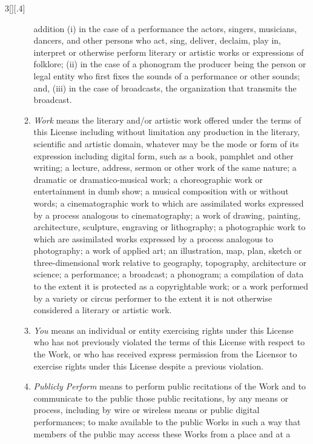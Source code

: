 \documentclass[8pt,a4paper]{article}
\begin{document}
\begin{multicols}{3}[][.4\paperwidth]
\begin{enumerate}
\begin{enumerate}
        addition (i) in the case of a performance the actors, singers,
        musicians, dancers, and other persons who act, sing, deliver, declaim,
        play in, interpret or otherwise perform literary or artistic works or
        expressions of folklore; (ii) in the case of a phonogram the producer
        being the person or legal entity who first fixes the sounds of a
        performance or other sounds; and, (iii) in the case of broadcasts, the
        organization that transmits the broadcast.
  \item \emph{Work} means the literary and/or artistic work offered under the
        terms of this License including without limitation any production in the
        literary, scientific and artistic domain, whatever may be the mode or
        form of its expression including digital form, such as a book,
        pamphlet and other writing; a lecture, address, sermon or other work
        of the same nature; a dramatic or dramatico-musical work; a
        choreographic work or entertainment in dumb show; a musical
        composition with or without words; a cinematographic work to which are
        assimilated works expressed by a process analogous to cinematography;
        a work of drawing, painting, architecture, sculpture, engraving or
        lithography; a photographic work to which are assimilated works
        expressed by a process analogous to photography; a work of applied
        art; an illustration, map, plan, sketch or three-dimensional work
        relative to geography, topography, architecture or science; a
        performance; a broadcast; a phonogram; a compilation of data to the
        extent it is protected as a copyrightable work; or a work performed by
        a variety or circus performer to the extent it is not otherwise
        considered a literary or artistic work.
  \item \emph{You} means an individual or entity exercising rights under this
        License who has not previously violated the terms of this License with
        respect to the Work, or who has received express permission from the
        Licensor to exercise rights under this License despite a previous
        violation.
  \item \emph{Publicly Perform} means to perform public recitations of the Work
        and to communicate to the public those public recitations, by any means
        or process, including by wire or wireless means or public digital
        performances; to make available to the public Works in such a way that
        members of the public may access these Works from a place and at a

\end{enumerate}
\end{enumerate}
\end{multicols}
\end{document}
